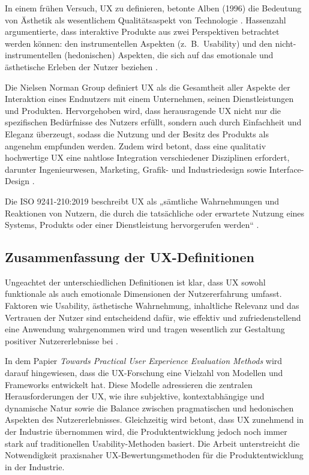 \documentclass[12pt,oneside]{article}
\begin{document}
In einem frühen Versuch, UX zu definieren, betonte Alben (1996) die Bedeutung von Ästhetik als wesentlichem Qualitätsaspekt von Technologie \cite{research}. Hassenzahl argumentierte, dass interaktive Produkte aus zwei Perspektiven betrachtet werden können: den instrumentellen Aspekten (z.~B.\ Usability)
 und den nicht-instrumentellen (hedonischen) Aspekten, die sich auf das emotionale und ästhetische Erleben der Nutzer beziehen \cite{hassenzahl2003}.

Die Nielsen Norman Group definiert UX als die Gesamtheit aller Aspekte der Interaktion eines Endnutzers mit einem Unternehmen, seinen Dienstleistungen und Produkten. Hervorgehoben wird, dass herausragende UX nicht nur die spezifischen Bedürfnisse des Nutzers erfüllt, sondern auch durch Einfachheit und Eleganz überzeugt, sodass die Nutzung und der Besitz des Produkts als angenehm empfunden werden. Zudem wird betont, dass eine qualitativ hochwertige UX eine nahtlose Integration verschiedener Disziplinen erfordert, darunter Ingenieurwesen, Marketing, Grafik- und Industriedesign sowie Interface-Design \cite{nngroup}.

Die ISO 9241-210:2019 beschreibt UX als „sämtliche Wahrnehmungen und Reaktionen von Nutzern, die durch die tatsächliche oder erwartete Nutzung eines Systems, Produkts oder einer Dienstleistung hervorgerufen werden“ \cite{ISO}.

\subsection{Zusammenfassung der UX-Definitionen}

Ungeachtet der unterschiedlichen Definitionen ist klar, dass UX sowohl funktionale als auch emotionale Dimensionen der Nutzererfahrung umfasst. Faktoren wie Usability, ästhetische Wahrnehmung, inhaltliche Relevanz und das Vertrauen der Nutzer sind entscheidend dafür, wie effektiv und zufriedenstellend eine Anwendung wahrgenommen wird und tragen wesentlich zur Gestaltung positiver Nutzererlebnisse bei \cite{toolbox}.

In dem Papier \textit{Towards Practical User Experience Evaluation Methods} \cite{evaluationmethods} wird darauf hingewiesen, dass die UX-Forschung eine Vielzahl von Modellen und Frameworks entwickelt hat. Diese Modelle adressieren die zentralen Herausforderungen der UX, wie ihre subjektive, kontextabhängige und dynamische Natur sowie die Balance zwischen pragmatischen und hedonischen Aspekten des Nutzererlebnisses. Gleichzeitig wird betont, dass UX zunehmend in der Industrie übernommen wird, die Produktentwicklung jedoch noch immer stark auf traditionellen Usability-Methoden basiert. Die Arbeit unterstreicht die Notwendigkeit praxisnaher UX-Bewertungsmethoden für die Produktentwicklung in der Industrie.
\end{document}
